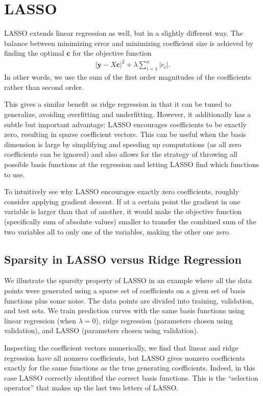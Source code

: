 \documentclass[10pt]{paper}
\begin{document}
\section{LASSO}

LASSO extends linear regression as well, but in a slightly different way. The balance between minimizing error and minimizing coefficient size is achieved by finding the optimal $\bm{c}$ for the objective function
\begin{align}
|\bm{y} - X \bm{c}|^2 + \lambda \sum_{i=1}^{n} |c_i|.
\end{align}
In other words, we use the sum of the first order magnitudes of the coefficients rather than second order.

This gives a similar benefit as ridge regression in that it can be tuned to generalize, avoiding overfitting and underfitting. However, it additionally has a subtle but important advantage: LASSO encourages coefficients to be exactly zero, resulting in sparse coefficient vectors. This can be useful when the basis dimension is large by simplifying and speeding up computations (as all zero coefficients can be ignored) and also allows for the strategy of throwing all possible basis functions at the regression and letting LASSO find which functions to use.

To intuitively see why LASSO encourages exactly zero coefficients, roughly consider applying gradient descent. If at a certain point the gradient in one variable is larger than that of another, it would make the objective function (specifically sum of absolute values) smaller to transfer the combined sum of the two variables all to only one of the variables, making the other one zero.

\subsection{Sparsity in LASSO versus Ridge Regression}

We illustrate the sparsity property of LASSO in an example where all the data points were generated using a sparse set of coefficients on a given set of basis functions plus some noise. The data points are divided into training, validation, and test sets. We train prediction curves with the same basis functions using linear regression (when $\lambda = 0$), ridge regression (parameters chosen using validation), and LASSO (parameters chosen using validation). 

Inspecting the coefficient vectors numerically, we find that linear and ridge regression have all nonzero coefficients, but LASSO gives nonzero coefficients exactly for the same functions as the true generating coefficients. Indeed, in this case LASSO correctly identified the correct basis functions. This is the ``selection operator'' that makes up the last two letters of LASSO.
\end{document}
